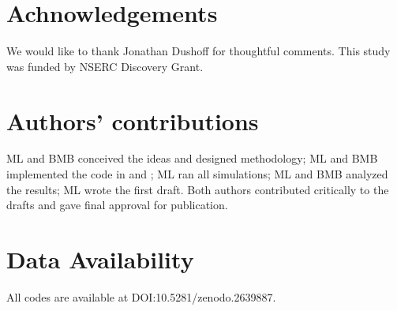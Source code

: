 \documentclass[12pt]{article}
\begin{document}
\section*{Achnowledgements}

We would like to thank Jonathan Dushoff for thoughtful comments.
This study was funded by NSERC Discovery Grant.

\section*{Authors’ contributions}

ML and BMB conceived the ideas and designed methodology; ML and BMB implemented the code in  and ; ML ran all simulations; ML and BMB analyzed the results; ML wrote the first draft. Both authors contributed critically to the drafts and gave final approval for publication.

\section*{Data Availability}

All codes are available at DOI:10.5281/zenodo.2639887.


\end{document}
